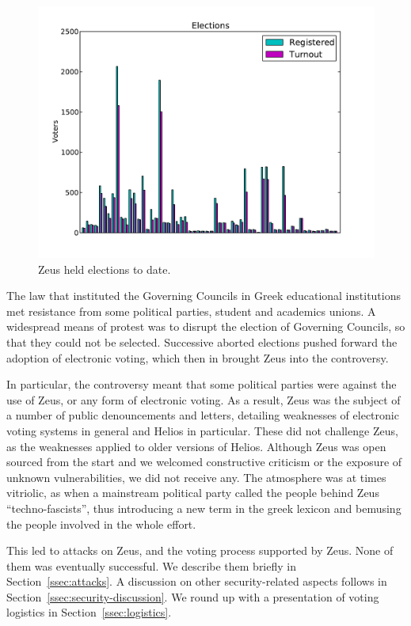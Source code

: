 \documentclass[jets]{usenixjournal}
\begin{document}
\begin{figure}[ht]
  \begin{center}
    \includegraphics[scale=0.7]{elections_to_date.pdf}
  \end{center}
  \caption{Zeus held elections to date.}
  \label{fig:elections_to_date}
\end{figure}

The law that instituted the Governing Councils in Greek educational
institutions met resistance from some political parties, student and
academics unions. A widespread means of protest was to disrupt the
election of Governing Councils, so that they could not be selected.
Successive aborted elections pushed forward the adoption of electronic
voting, which then in brought Zeus into the controversy. 

In particular, the controversy meant that some political parties were
against the use of Zeus, or any form of electronic voting. As a
result, Zeus was the subject of a number of public denouncements and
letters, detailing weaknesses of electronic voting systems in general
and Helios in particular. These did not challenge Zeus, as the
weaknesses applied to older versions of Helios. Although Zeus was open
sourced from the start and we welcomed constructive criticism or the
exposure of unknown vulnerabilities, we did not receive any. The
atmosphere was at times vitriolic, as when a mainstream political
party called the people behind Zeus ``techno-fascists'', thus
introducing a new term in the greek lexicon and bemusing the people
involved in the whole effort.

This led to attacks on Zeus, and the voting process supported by Zeus.
None of them was eventually successful. We describe them briefly in
Section~\ref{ssec:attacks}. A discussion on other security-related
aspects follows in Section~\ref{ssec:security-discussion}. We round up
with a presentation of voting logistics in
Section~\ref{ssec:logistics}.
\end{document}
